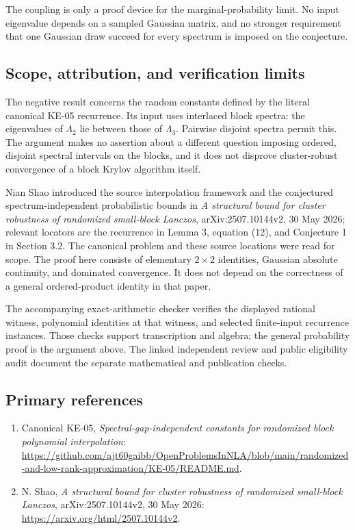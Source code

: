 \documentclass[10pt,a4paper]{article}
\providecommand{\tightlist}{\setlength{\itemsep}{0pt}\setlength{\parskip}{0pt}}
\begin{document}
The coupling is only a proof device for the marginal-probability limit. No input eigenvalue depends on a sampled Gaussian matrix, and no stronger requirement that one Gaussian draw succeed for every spectrum is imposed on the conjecture.

\subsection{Scope, attribution, and verification limits}\label{scope-attribution-and-verification-limits}

The negative result concerns the random constants defined by the literal canonical KE-05 recurrence. Its input uses interlaced block spectra: the eigenvalues of \(\Lambda_2\) lie between those of \(\Lambda_3\). Pairwise disjoint spectra permit this. The argument makes no assertion about a different question imposing ordered, disjoint spectral intervals on the blocks, and it does not disprove cluster-robust convergence of a block Krylov algorithm itself.

Nian Shao introduced the source interpolation framework and the conjectured spectrum-independent probabilistic bounds in \emph{A structural bound for cluster robustness of randomized small-block Lanczos}, arXiv:2507.10144v2, 30 May 2026; relevant locators are the recurrence in Lemma 3, equation (12), and Conjecture 1 in Section 3.2. The canonical problem and these source locations were read for scope. The proof here consists of elementary \(2\times2\) identities, Gaussian absolute continuity, and dominated convergence. It does not depend on the correctness of a general ordered-product identity in that paper.

The accompanying exact-arithmetic checker verifies the displayed rational witness, polynomial identities at that witness, and selected finite-input recurrence instances. Those checks support transcription and algebra; the general probability proof is the argument above. The linked independent review and public eligibility audit document the separate mathematical and publication checks.

\subsection{Primary references}\label{primary-references}

\begin{enumerate}
\def\labelenumi{\arabic{enumi}.}
\tightlist
\item
  Canonical KE-05, \emph{Spectral-gap-independent constants for randomized block polynomial interpolation}: \url{https://github.com/ajt60gaibb/OpenProblemsInNLA/blob/main/randomized-and-low-rank-approximation/KE-05/README.md}.
\item
  N. Shao, \emph{A structural bound for cluster robustness of randomized small-block Lanczos}, arXiv:2507.10144v2, 30 May 2026: \url{https://arxiv.org/html/2507.10144v2}.
\end{enumerate}
\end{document}
